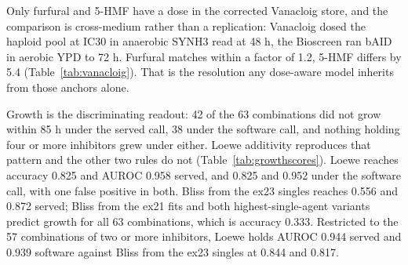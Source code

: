 
 Only furfural and 5-HMF have a dose in the
corrected Vanacloig store, and the comparison is cross-medium rather than a replication:
Vanacloig dosed the haploid pool at IC30 in anaerobic SYNH3 read at 48 h, the Bioscreen
ran bAID in aerobic YPD to 72 h. Furfural matches within a factor of 1.2, 5-HMF differs
by 5.4 (Table~\ref{tab:vanacloig}). That is the resolution any dose-aware model inherits
from those anchors alone.

\begin{table}[htbp]
\centering
\footnotesize
\caption[]{IC30 in the public screen against IC30 from the ex21 Hill fit. Levulinic acid
has no condition in the corrected store, which the script confirms by reading all 34
condition blocks. Acetate is present only in build 001 and carries no IC30 row here.}
\label{tab:vanacloig}

\end{table}

 Growth is the discriminating readout: 42 of the 63
combinations did not grow within 85 h under the served call, 38 under the software call,
and nothing holding four or more inhibitors grew under either. Loewe additivity
reproduces that pattern and the other two rules do not (Table~\ref{tab:growthscores}).
Loewe reaches accuracy 0.825 and AUROC 0.958 served, and 0.825 and 0.952 under the
software call, with one false positive in both. Bliss from the ex23 singles reaches
0.556 and 0.872 served; Bliss from the ex21 fits and both highest-single-agent variants
predict growth for all 63 combinations, which is accuracy 0.333. Restricted to the 57
combinations of two or more inhibitors, Loewe holds AUROC 0.944 served and 0.939
software against Bliss from the ex23 singles at 0.844 and 0.817.

